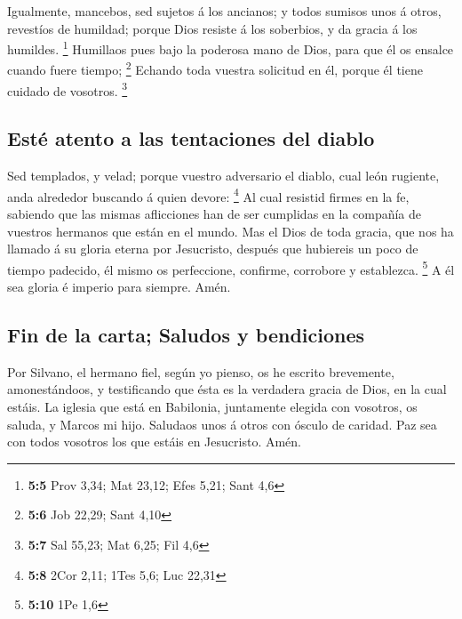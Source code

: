  Igualmente, mancebos, sed sujetos á los ancianos; y todos
sumisos unos á otros, revestíos de humildad; porque Dios resiste á los
soberbios, y da gracia á los humildes. \footnote{\textbf{5:5} Prov 3,34;
  Mat 23,12; Efes 5,21; Sant 4,6}  Humillaos pues bajo la
poderosa mano de Dios, para que él os ensalce cuando fuere tiempo;
\footnote{\textbf{5:6} Job 22,29; Sant 4,10}  Echando toda
vuestra solicitud en él, porque él tiene cuidado de vosotros.
\footnote{\textbf{5:7} Sal 55,23; Mat 6,25; Fil 4,6}

\hypertarget{estuxe9-atento-a-las-tentaciones-del-diablo}{%
\subsection{Esté atento a las tentaciones del
diablo}\label{estuxe9-atento-a-las-tentaciones-del-diablo}}

 Sed templados, y velad; porque vuestro adversario el
diablo, cual león rugiente, anda alrededor buscando á quien devore:
\footnote{\textbf{5:8} 2Cor 2,11; 1Tes 5,6; Luc 22,31}  Al
cual resistid firmes en la fe, sabiendo que las mismas aflicciones han
de ser cumplidas en la compañía de vuestros hermanos que están en el
mundo.  Mas el Dios de toda gracia, que nos ha llamado á
su gloria eterna por Jesucristo, después que hubiereis un poco de tiempo
padecido, él mismo os perfeccione, confirme, corrobore y establezca.
\footnote{\textbf{5:10} 1Pe 1,6}  A él sea gloria é
imperio para siempre. Amén.

\hypertarget{fin-de-la-carta-saludos-y-bendiciones}{%
\subsection{Fin de la carta; Saludos y
bendiciones}\label{fin-de-la-carta-saludos-y-bendiciones}}

 Por Silvano, el hermano fiel, según yo pienso, os he
escrito brevemente, amonestándoos, y testificando que ésta es la
verdadera gracia de Dios, en la cual estáis.  La iglesia
que está en Babilonia, juntamente elegida con vosotros, os saluda, y
Marcos mi hijo.  Saludaos unos á otros con ósculo de
caridad. Paz sea con todos vosotros los que estáis en Jesucristo. Amén.
